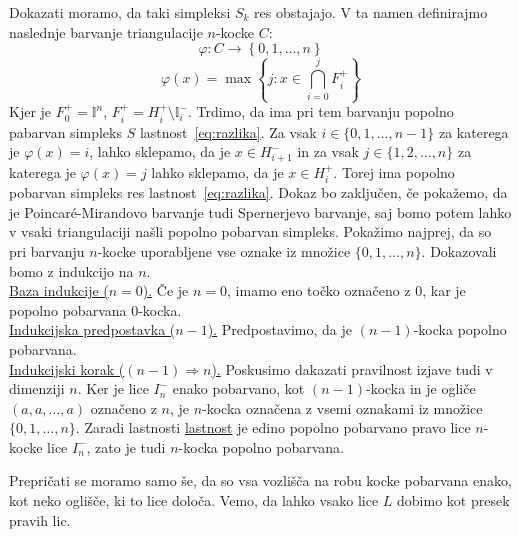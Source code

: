 \documentclass[mat1]{fmfdelo}
\newcommand{\I}{\mathbb I}
\newcommand{\0}{\underline{0}}
\begin{document}
\begin{dokaz}
Dokazati moramo, da taki simpleksi $S_k$ res obstajajo. V ta namen definirajmo naslednje barvanje triangulacije $n$-kocke $C$:
$$\varphi : C \to \left \{ 0, 1, \dots, n \right \}$$
$$\varphi(x) = \max \left \{ j : x \in \bigcap_{i=0}^j F_i^+\right \}$$
Kjer je $ F_0^+ = \I^n$, $ F_i^+ =  H_i^+ \setminus \I_i^-$.
Trdimo, da ima pri tem barvanju popolno pabarvan simpleks $S$ lastnost~\eqref{eq:razlika}. Za vsak $i \in \{0, 1, \dots, n-1 \}$ za katerega je $\varphi(x) = i$, lahko sklepamo, da je $x \in H_{i+1}^-$ in za vsak $j \in \{ 1, 2, \dots, n \}$ za katerega je $\varphi(x) = j$ lahko sklepamo, da je $x \in H_i^+$. Torej ima popolno pobarvan simpleks res lastnost~\eqref{eq:razlika}. Dokaz bo zaključen, če pokažemo, da je Poincar\'e-Mirandovo barvanje tudi Spernerjevo barvanje, saj bomo potem lahko v vsaki triangulaciji našli popolno pobarvan simpleks.
Pokažimo najprej, da so pri barvanju $n$-kocke uporabljene vse oznake iz množice $\{ 0, 1, \dots, n \}$. Dokazovali bomo z indukcijo na $n$.\\
\underline{Baza indukcije ($n = 0$).}
Če je $n=0$, imamo eno točko označeno z $0$, kar je popolno pobarvana $0$-kocka.\\
\underline{Indukcijska predpostavka ($n - 1$).}
Predpostavimo, da je $(n-1)$-kocka popolno pobarvana. \\
\underline{Indukcijski korak ($(n - 1) \Longrightarrow n$).}
Poskusimo dakazati pravilnost izjave tudi v dimenziji $n$. Ker je lice $I_n^-$ enako pobarvano, kot $(n-1)$-kocka in je ogliče $(a, a, \dots, a)$ označeno z $n$, je $n$-kocka označena z vsemi oznakami iz množice $\{ 0, 1, \dots, n \}$. Zaradi lastnosti \underline{lastnost} je edino popolno pobarvano pravo lice $n$-kocke lice $I_n^-$, zato je tudi $n$-kocka popolno pobarvana.

Prepričati se moramo samo še, da so vsa vozlišča na robu kocke pobarvana enako, kot neko oglišče, ki to lice določa. Vemo, da lahko vsako lice $L$ dobimo kot presek pravih lic.





\end{dokaz}
\end{document}
